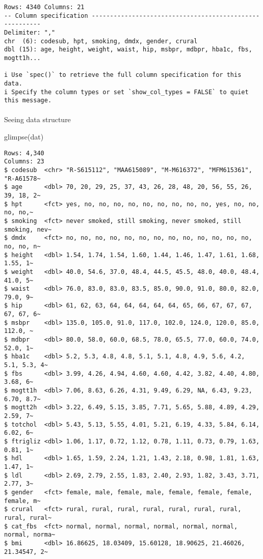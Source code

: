 \documentclass[
  letterpaper,
  DIV=11,
  numbers=noendperiod]{scrartcl}
\makeatletter
\let\oldparagraph\paragraph
\renewcommand{\paragraph}{
    \@ifstar
      \xxxParagraphStar
      \xxxParagraphNoStar
  }
\newcommand{\xxxParagraphStar}[1]{\oldparagraph*{#1}\mbox{}}
\newcommand{\xxxParagraphNoStar}[1]{\oldparagraph{#1}\mbox{}}
\newenvironment{Shaded}{\begin{snugshade}}{\end{snugshade}}
\newcommand{\FunctionTok}[1]{\textcolor[rgb]{0.28,0.35,0.67}{#1}}
\newcommand{\NormalTok}[1]{\textcolor[rgb]{0.00,0.23,0.31}{#1}}
\makeatother
\begin{document}
\begin{verbatim}
Rows: 4340 Columns: 21
-- Column specification --------------------------------------------------------
Delimiter: ","
chr  (6): codesub, hpt, smoking, dmdx, gender, crural
dbl (15): age, height, weight, waist, hip, msbpr, mdbpr, hba1c, fbs, mogtt1h...

i Use `spec()` to retrieve the full column specification for this data.
i Specify the column types or set `show_col_types = FALSE` to quiet this message.
\end{verbatim}

\paragraph{Seeing data structure}\label{seeing-data-structure}

\begin{Shaded}
\begin{Highlighting}[]
\FunctionTok{glimpse}\NormalTok{(dat)}
\end{Highlighting}
\end{Shaded}

\begin{verbatim}
Rows: 4,340
Columns: 23
$ codesub  <chr> "R-S615112", "MAA615089", "M-M616372", "MFM615361", "R-A61578~
$ age      <dbl> 70, 20, 29, 25, 37, 43, 26, 28, 48, 20, 56, 55, 26, 39, 18, 2~
$ hpt      <fct> yes, no, no, no, no, no, no, no, no, no, yes, no, no, no, no,~
$ smoking  <fct> never smoked, still smoking, never smoked, still smoking, nev~
$ dmdx     <fct> no, no, no, no, no, no, no, no, no, no, no, no, no, no, no, n~
$ height   <dbl> 1.54, 1.74, 1.54, 1.60, 1.44, 1.46, 1.47, 1.61, 1.68, 1.55, 1~
$ weight   <dbl> 40.0, 54.6, 37.0, 48.4, 44.5, 45.5, 48.0, 40.0, 48.4, 41.0, 5~
$ waist    <dbl> 76.0, 83.0, 83.0, 83.5, 85.0, 90.0, 91.0, 80.0, 82.0, 79.0, 9~
$ hip      <dbl> 61, 62, 63, 64, 64, 64, 64, 64, 65, 66, 67, 67, 67, 67, 67, 6~
$ msbpr    <dbl> 135.0, 105.0, 91.0, 117.0, 102.0, 124.0, 120.0, 85.0, 112.0, ~
$ mdbpr    <dbl> 80.0, 58.0, 60.0, 68.5, 78.0, 65.5, 77.0, 60.0, 74.0, 52.0, 1~
$ hba1c    <dbl> 5.2, 5.3, 4.8, 4.8, 5.1, 5.1, 4.8, 4.9, 5.6, 4.2, 5.1, 5.3, 4~
$ fbs      <dbl> 3.99, 4.26, 4.94, 4.60, 4.60, 4.42, 3.82, 4.40, 4.80, 3.68, 6~
$ mogtt1h  <dbl> 7.06, 8.63, 6.26, 4.31, 9.49, 6.29, NA, 6.43, 9.23, 6.70, 8.7~
$ mogtt2h  <dbl> 3.22, 6.49, 5.15, 3.85, 7.71, 5.65, 5.88, 4.89, 4.29, 2.59, 7~
$ totchol  <dbl> 5.43, 5.13, 5.55, 4.01, 5.21, 6.19, 4.33, 5.84, 6.14, 6.02, 6~
$ ftrigliz <dbl> 1.06, 1.17, 0.72, 1.12, 0.78, 1.11, 0.73, 0.79, 1.63, 0.81, 1~
$ hdl      <dbl> 1.65, 1.59, 2.24, 1.21, 1.43, 2.18, 0.98, 1.81, 1.63, 1.47, 1~
$ ldl      <dbl> 2.69, 2.79, 2.55, 1.83, 2.40, 2.93, 1.82, 3.43, 3.71, 2.77, 3~
$ gender   <fct> female, male, female, male, female, female, female, female, m~
$ crural   <fct> rural, rural, rural, rural, rural, rural, rural, rural, rural~
$ cat_fbs  <fct> normal, normal, normal, normal, normal, normal, normal, norma~
$ bmi      <dbl> 16.86625, 18.03409, 15.60128, 18.90625, 21.46026, 21.34547, 2~
\end{verbatim}
\end{document}
